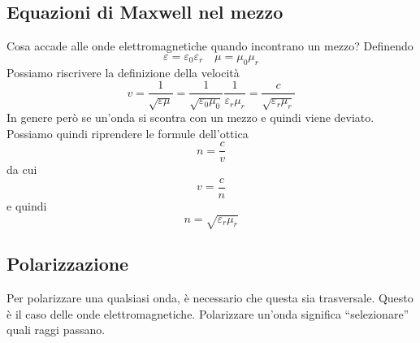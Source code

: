 \subsection{Equazioni di Maxwell nel mezzo}
Cosa accade alle onde elettromagnetiche quando incontrano un mezzo? Definendo
\begin{equation*}
  \varepsilon = \varepsilon_0\varepsilon_r \quad \mu=\mu_0\mu_r
\end{equation*}
Possiamo riscrivere la definizione della velocità
\begin{equation*}
  v = \frac{1}{\sqrt{\varepsilon\mu}} = 
  \frac{1}{\sqrt{\varepsilon_0\mu_0}}\frac{1}{\varepsilon_r\mu_r} =
  \frac{c}{\sqrt{\varepsilon_r\mu_r}}
\end{equation*}
In genere però se un'onda si scontra con un mezzo e quindi viene deviato. Possiamo quindi 
riprendere le formule dell'ottica
\begin{equation*}
  n = \frac{c}{v}
\end{equation*}
da cui
\begin{equation*}
  v = \frac{c}{n}
\end{equation*}
e quindi
\begin{equation*}
  n = \sqrt{\varepsilon_r\mu_r} 
\end{equation*}
\subsection{Polarizzazione}
Per polarizzare una qualsiasi onda, è necessario che questa sia trasversale. Questo è il caso delle
onde elettromagnetiche. Polarizzare un'onda significa ``selezionare'' quali raggi passano.
